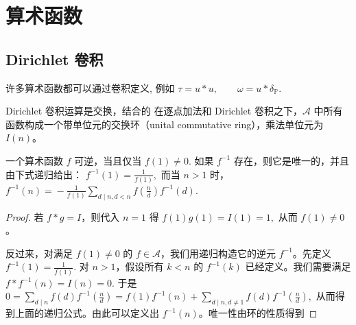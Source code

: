 \setcounter{chapter}{-1}
\chapter{算术函数}



\section{Dirichlet 卷积}


\begin{remark}
	许多算术函数都可以通过卷积定义, 例如
	\(\textstyle \tau=\allowbreak{}u*u,\allowbreak{} \qquad \omega=\allowbreak{}u*\delta_{\mathbb P}.\)
	

\end{remark}

\begin{theorem}
	Dirichlet 卷积运算是交换，结合的
在逐点加法和 Dirichlet 卷积之下，$\mathcal A$ 中所有函数构成一个带单位元的交换环（unital commutative ring），乘法单位元为 $I(n)$。

\end{theorem}


\begin{theorem}
	一个算术函数 $f$ 可逆，当且仅当
	\(
		f(1)\neq 0.
	\)
	如果 $f^{-1}$ 存在，则它是唯一的，并且由下式递归给出：
	\(\textstyle f^{-1}(1)=\allowbreak{}\frac{1}{f(1)},\allowbreak{}\)
	而当 $n>1$ 时，
	\(\textstyle f^{-1}(n) =\allowbreak{} -\frac{1}{f(1)} \sum_{d\mid\allowbreak{} n,\allowbreak{} d<n} f\left(\frac nd\right)f^{-1}(d).\)
\end{theorem}

\begin{proof}
	若 $f*g=I$，则代入 $n=1$ 得
	\(\textstyle f(1)g(1)=\allowbreak{}I(1)=\allowbreak{}1,\allowbreak{}\)
	从而 $f(1)\neq 0$。

	反过来，对满足 $f(1)\neq 0$ 的 $f\in\mathcal A$，我们用递归构造它的逆元 $f^{-1}$。先定义
	\(\textstyle f^{-1}(1)=\allowbreak{}\frac1{f(1)}.\)
	对 $n>1$，假设所有 $k<n$ 的 $f^{-1}(k)$ 已经定义。我们需要满足
	\(\textstyle f*f^{-1}(n)=\allowbreak{}I(n)=\allowbreak{}0.\)
	于是
	\(\textstyle 0 =\allowbreak{} \sum_{d\mid\allowbreak{} n} f(d)f^{-1}\left(\frac nd\right) =\allowbreak{} f(1)f^{-1}(n) +\allowbreak{} \sum_{d\mid\allowbreak{} n,\allowbreak{} d\neq\allowbreak{} 1} f(d)f^{-1}\left(\frac nd\right),\allowbreak{}\)
  从而得到上面的递归公式。由此可以定义出 $f^{-1}(n)$。唯一性由环的性质得到
\end{proof}

